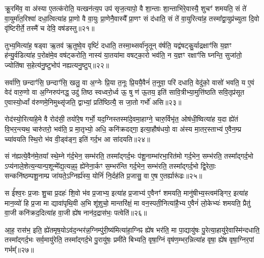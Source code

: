 {\anuvakamend[{ऐव प॒शूनिति॑ गृणाति होत॒रिति॑ स॒प्तविꣳ॑शतिश्च॥४॥}]}

क्रू॒रमि॑व॒ वा अ॑स्या ए॒तत्क॑रोति॒ यत्खन॑त्य॒प उप॑ सृज॒त्यापो॒ वै शा॒न्ताः शा॒न्ताभि॑रे॒वास्यै॒ शुचꣳ॑ शमयति॒ सं ते॑ वा॒युर्मा॑त॒रिश्वा॑ दधा॒त्वित्या॑ह प्रा॒णो वै वा॒युः प्रा॒णेनै॒वास्यै᳚ प्रा॒णꣳ सं द॑धाति॒ सं ते॑ वा॒युरित्या॑ह॒ तस्मा᳚द्वा॒युप्र॑च्युता दि॒वो वृ॑ष्टिरीर्ते॒ तस्मै॑ च देवि॒ वष॑डस्तु॥२१॥

तुभ्य॒मित्या॑ह॒ षड्वा ऋ॒तव॑ ऋ॒तुष्वे॒व वृष्टिं॑ दधाति॒ तस्मा॒थ्सर्वा॑नृ॒तून् व॑र्\mbox{}षति॒ यद्व॑षट्कु॒र्याद्रक्षाꣳ॑सि य॒ज्ञꣳ ह॑न्यु॒र्वडित्या॑ह प॒रोक्ष॑मे॒व वष॑ट्करोति॒ नास्य॑ या॒तया॑मा वषट्का॒रो भव॑ति॒ न य॒ज्ञꣳ रक्षाꣳ॑सि घ्नन्ति॒ सुजा॑तो॒ ज्योति॑षा स॒हेत्य॑नु॒ष्टुभोप॑ नह्यत्यनु॒ष्टुप्॥२२॥

सर्वा॑णि॒ छन्दाꣳ॑सि॒ छन्दाꣳ॑सि॒ खलु॒ वा अ॒ग्नेः प्रि॒या त॒नूः प्रि॒ययै॒वैनं॑ त॒नुवा॒ परि॑ दधाति॒ वेदु॑को॒ वासो॑ भवति॒ य ए॒वं वेद॑ वारु॒णो वा अ॒ग्निरुप॑नद्ध॒ उदु॑ तिष्ठ स्वध्वरो॒र्ध्व ऊ॒ षु ण॑ ऊ॒तय॒ इति॑ सावि॒त्रीभ्या॒मुत्ति॑ष्ठति सवि॒तृप्र॑सूत ए॒वास्यो॒र्ध्वां व॑रुणमे॒निमुथ्सृ॑जति॒ द्वाभ्यां॒ प्रति॑ष्ठित्यै॒ स जा॒तो गर्भो॑ असि॥२३॥

रोद॑स्यो॒रित्या॑हे॒मे वै रोद॑सी॒ तयो॑रे॒ष गर्भो॒ यद॒ग्निस्तस्मा॑दे॒वमा॒हाग्ने॒ चारु॒र्विभृ॑त॒ ओष॑धी॒ष्वित्या॑ह य॒दा ह्ये॑तं वि॒भर॒न्त्यथ॒ चारु॑तरो॒ भव॑ति॒ प्र मा॒तृभ्यो॒ अधि॒ कनि॑क्रदद्गा॒ इत्या॒हौष॑धयो॒ वा अ॑स्य मा॒तर॒स्ताभ्य॑ ए॒वैन॒म्प्र च्या॑वयति स्थि॒रो भ॑व वी॒ड्व॑ङ्ग॒ इति॑ गर्द॒भ आ सा॑दयति॥२४॥

सं न॑ह्यत्ये॒वैन॑मे॒तया᳚ स्थे॒म्ने ग॑र्द॒भेन॒ सम्भ॑रति॒ तस्मा᳚द्गर्द॒भः प॑शू॒नाम्भा॑रभा॒रित॑मो गर्द॒भेन॒ सम्भ॑रति॒ तस्मा᳚द्गर्द॒भो \-ऽप्य॑नाले॒शेत्य॒न्यान्प॒शून्मे᳚द्य॒त्यन्न॒ꣴ॒ ह्ये॑नेना॒र्कꣳ स॒म्भर॑न्ति गर्द॒भेन॒ सम्भ॑रति॒ तस्मा᳚द्गर्द॒भो द्वि॒रेताः॒ सन्कनि॑ष्ठम्पशू॒नाम्प्र जा॑यते॒\-ऽग्निर्ह्य॑स्य॒ योनिं॑ नि॒र्दह॑ति प्र॒जासु॒ वा ए॒ष ए॒तर्\mbox{}ह्यारू॑ढः॥२५॥

स ई᳚श्व॒रः प्र॒जाः शु॒चा प्र॒दहः॑ शि॒वो भ॑व प्र॒जाभ्य॒ इत्या॑ह प्र॒जाभ्य॑ ए॒वैनꣳ॑ शमयति॒ मानु॑षीभ्य॒स्त्वम॑ङ्गिर॒ इत्या॑ह मान॒व्यो॑ हि प्र॒जा मा द्यावा॑पृथि॒वी अ॒भि शू॑शुचो॒ मान्तरि॑क्षं॒ मा वन॒स्पती॒नित्या॑है॒भ्य ए॒वैनं॑ लो॒केभ्यः॑ शमयति॒ प्रैतु॑ वा॒जी कनि॑क्रद॒दित्या॑ह वा॒जी ह्ये॑ष नान॑द॒द्रास॑भः॒ पत्वेति॑॥२६॥

आ॒ह॒ रास॑भ॒ इति॒ ह्ये॑तमृष॒यो\-ऽव॑द॒न्भर॑न्न॒ग्निम्पु॑री॒ष्य॑मित्या॑हा॒ग्निꣴ ह्ये॑ष भर॑ति॒ मा पा॒द्यायु॑षः पु॒रेत्या॒हायु॑रे॒वास्मि॑न्दधाति॒ तस्मा᳚द्गर्द॒भः सर्व॒मायु॑रेति॒ तस्मा᳚द्गर्द॒भे पु॒रायु॑षः॒ प्रमी॑ते बिभ्यति॒ वृषा॒ग्निं वृष॑ण॒म्भर॒न्नित्या॑ह वृषा॒ ह्ये॑ष वृषा॒ग्निर॒पां गर्भम्᳚॥२७॥

